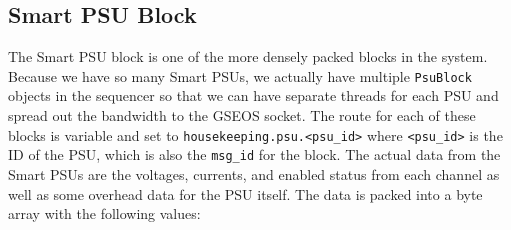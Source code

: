 \subsection{Smart PSU Block}
The Smart PSU block is one of the more densely packed blocks in the system.
Because we have so many Smart PSUs, we actually have multiple \texttt{PsuBlock} objects in the sequencer so that we can have separate threads for each PSU and spread out the bandwidth to the GSEOS socket.
The route for each of these blocks is variable and set to \texttt{housekeeping.psu.<psu\_id>} where \texttt{<psu\_id>} is the ID of the PSU, which is also the \texttt{msg\_id} for the block. 
The actual data from the Smart PSUs are the voltages, currents, and enabled status from each channel as well as some overhead data for the PSU itself.
The data is packed into a byte array with the following values:

